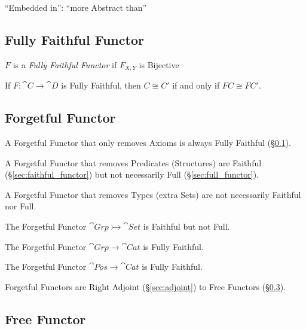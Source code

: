 ``Embedded in'': ``more Abstract than''



\subsection{Fully Faithful Functor}\label{sec:fully_faithful}

$F$ is a \emph{Fully Faithful Functor} if $F_{X,Y}$ is Bijective

If $F : \cat{C} \rightarrow \cat{D}$ is Fully Faithful, then $C
\cong C'$ if and only if $FC \cong FC'$.



\subsection{Forgetful Functor}\label{sec:forgetful_functor}

A Forgetful Functor that only removes Axioms is always Fully Faithful
(\S\ref{sec:fully_faithful}).

A Forgetful Functor that removes Predicates (Structures) are Faithful
(\S\ref{sec:faithful_functor}) but not necessarily Full
(\S\ref{sec:full_functor}).

A Forgetful Functor that removes Types (extra Sets) are not
necessarily Faithful nor Full.

The Forgetful Functor $\cat{Grp} \rightarrowtail \cat{Set}$ is
Faithful but not Full.

The Forgetful Functor $\cat{Grp} \rightarrow \cat{Cat}$ is
Fully Faithful.

The Forgetful Functor $\cat{Pos} \rightarrow \cat{Cat}$ is
Fully Faithful.

Forgetful Functors are Right Adjoint (\S\ref{sec:adjoint}) to Free
Functors (\S\ref{sec:free_functor}).



\subsection{Free Functor}\label{sec:free_functor}

